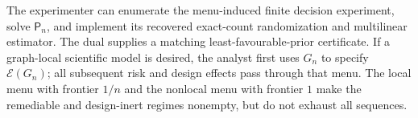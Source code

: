The experimenter can enumerate the menu-induced finite decision experiment, solve \(\mathsf P_n\), and implement its recovered exact-count randomization and multilinear estimator. The dual supplies a matching least-favourable-prior certificate. If a graph-local scientific model is desired, the analyst first uses \(G_n\) to specify \(\mathcal E(G_n)\); all subsequent risk and design effects pass through that menu. The local menu with frontier \(1/n\) and the nonlocal menu with frontier \(1\) make the remediable and design-inert regimes nonempty, but do not exhaust all sequences.
